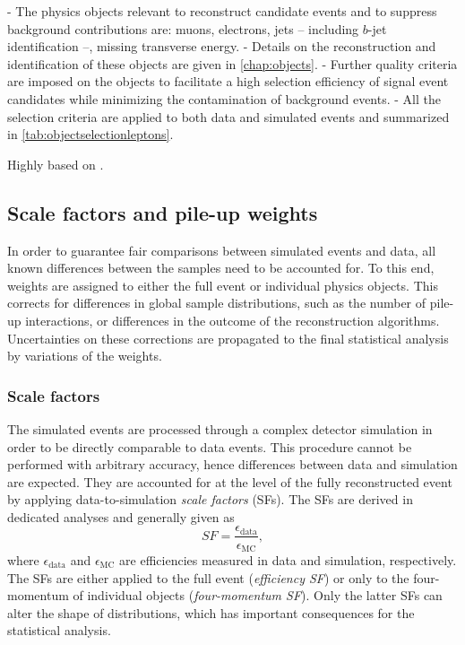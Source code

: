 - The physics objects relevant to reconstruct \HWWdet candidate events and to suppress background contributions are: muons, electrons, jets -- including $b$-jet identification --, missing transverse energy.
- Details on the reconstruction and identification of these objects are given in \cref{chap:objects}.
- Further quality criteria are imposed on the objects to facilitate a high selection efficiency of signal event candidates while minimizing the contamination of background events.
- All the selection criteria are applied to both data and simulated events and summarized in \cref{tab:objectselectionleptons}.

Highly based on .

\subsection{Scale factors and pile-up weights}
In order to guarantee fair comparisons between simulated events and data, all known differences between the samples need to be accounted for.
To this end, weights are assigned to either the full event or individual physics objects. This corrects for differences in global sample distributions, such as the number of pile-up interactions, or differences in the outcome of the reconstruction algorithms.
Uncertainties on these corrections are propagated to the final statistical analysis by variations of the weights.

\subsubsection{Scale factors}
The simulated events are processed through a complex detector simulation in order to be directly comparable to data events. This procedure cannot be performed with arbitrary accuracy, hence differences between data and simulation are expected.
They are accounted for at the level of the fully reconstructed event by applying data-to-simulation \emph{scale factors} (SFs). The SFs are derived in dedicated analyses and generally given as
\begin{equation}
    SF = \frac{\epsilon_\text{data}}{\epsilon_{\text{MC}}},
\end{equation}
where $\epsilon_\text{data}$ and $\epsilon_\text{MC}$ are efficiencies measured in data and simulation, respectively.
The SFs are either applied to the full event (\emph{efficiency SF}) or only to the four-momentum of individual objects (\emph{four-momentum SF}). Only the latter SFs can alter the shape of distributions, which has important consequences for the statistical analysis.

